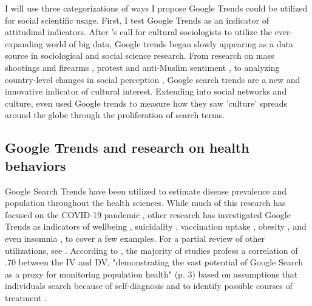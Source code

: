 I will use three categorizations of ways I propose Google Trends could be
utilized for social scientific usage. First, I test Google Trends as an
indicator of attitudinal indicators. After
\citet{bailCulturalEnvironmentMeasuring2014}'s call for cultural sociologists to
utilize the ever-expanding world of big data, Google trends began slowly
appearing as a data source in sociological and social science research. From
research on mass shootings and firearms
\citep{brownsteinInternetSearchPatterns2020, semenzaInformationseekingWakeTragedy2020},
protest and anti-Muslim sentiment
\citep{bailUsingInternetSearch2018,barrieSearchingRacismGeorge2020,grossThereFergusonEffect2017},
to analyzing country-level changes in social perception \citep{reyes_etal18},
Google search trends are a new and innovative indicator of cultural interest.
Extending into social networks and culture,
\citet{bailPrestigeProximityPrejudice2019} even used Google trends to measure
how they saw 'culture' spreads around the globe through the proliferation of
search terms.

\subsection{Google Trends and research on health behaviors}

Google Search Trends have been utilized to estimate disease prevalence and
population throughout the health sciences. While much of this research has
focused on the COVID-19 pandemic \citep{jimenez_etal20,
jimenezCOVID19SymptomGoogle2020, limEstimatingInformationSeekingBehaviour2020,
mavraganiCOVID19PredictabilityUnited2020, nguyenGoogleTrendsAnalysis2020,
todorovaInternetBasedData2021, mingUnderstandingHealthCommunication2021}, other
research has investigated Google Trends as indicators of wellbeing
\citep{brodeurCOVID19LockdownsWellbeing2021,
carpiTwitterSubjectiveWellBeing2020, duCOVID19IncreasesOnline2020}, suicidality
\citep{burnettTimeTrendsPublic2020}, vaccination uptake
\citep{dalumhansenEnsembleLearnedVaccination2016}, obesity
\citep{sarigulNowcastingObesityUsing2014}, and even insomnia
\citep{zittingGoogleTrendsReveal2020}, to cover a few examples. For a partial
review of other utilizations, see \citet{nutiUseGoogleTrends2014}. According to
\citet{jaidkaInformationseekingVsSharing2021}, the majority of studies profess a
correlation of \> .70 between the IV and DV, "demonstrating the vast potential
of Google Search as a proxy for monitoring population health" (p. 3) based on
assumptions that individuals search because of self-diagnosis and to identify
possible courses of treatment \citep{dechoudhurySeekingSharingHealth2014}.


